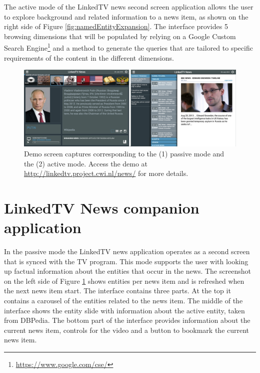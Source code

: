 \documentclass{llncs}
\begin{document}
The active mode of the LinkedTV news second screen application allows the user to explore background and related information to a news item, as shown on the right side of Figure \ref{fig:namedEntityExpansion}. The interface provides 5 browsing dimensions that will be populated by relying on a Google Custom Search Engine\footnote{\fontsize{8pt}{1em}\selectfont  \url{https://www.google.com/cse/}} and a method to generate the queries that are tailored to specific requirements of the content in the different dimensions.



\begin{figure}[t!]
\centering
\includegraphics[width=1\textwidth]{figure/DemoScreen}
\caption{Demo screen captures corresponding to the (1) passive mode and the (2) active mode. Access the demo at \protect\url{http://linkedtv.project.cwi.nl/news/} for more details.}
\label{fig:interface}%
\end{figure}

\section{LinkedTV News companion application}
\label{sec:tvnews}

In the passive mode the LinkedTV news application operates as a second screen that is synced with the TV program. This mode supports the user with looking up factual information about the entities that occur in the news. The screenshot on the left side of Figure \ref{fig:interface} shows entities per news item and is refreshed when the next news item start. The interface contains three parts. At the top it contains a carousel of the entities related to the news item. The middle of the interface shows the entity slide with information about the active entity, taken from DBPedia. The bottom part of the interface provides information about the current news item, controls for the video and a button to bookmark the current news item. 
\end{document}
